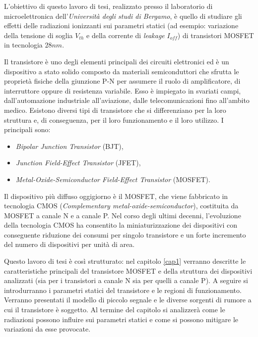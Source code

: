 L'obiettivo di questo lavoro di tesi, realizzato presso il laboratorio di microelettronica dell'\textit{Università degli studi di Bergamo}, è quello di studiare gli effetti delle radiazioni ionizzanti sui parametri statici (ad esempio: variazione della tensione di soglia $V_{th}$ e della corrente di \emph{leakage} $I_{off}$) di transistori MOSFET in tecnologia $28nm$. 

\vspace*{0.5cm}

Il transistore è uno degli elementi principali dei circuiti elettronici ed è un dispositivo a stato solido composto da materiali semiconduttori che sfrutta le proprietà fisiche della giunzione P-N per assumere il ruolo di amplificatore, di interruttore oppure di resistenza variabile.
Esso è impiegato in svariati campi, dall'automazione industriale all'aviazione, dalle telecomunicazioni fino all'ambito medico.
Esistono diversi tipi di transistore che si differenziano per la loro struttura e, di conseguenza, per il loro funzionamento e il loro utilizzo. I principali sono:
\begin{itemize}
    \item \textit{Bipolar Junction Transistor} (BJT),
    \item \textit{Junction Field-Effect Transistor} (JFET),
    \item \textit{Metal-Oxide-Semiconductor Field-Effect Transistor} (MOSFET).
\end{itemize}

Il dispositivo più diffuso oggigiorno è il MOSFET, che viene fabbricato in tecnologia CMOS (\textit{Complementary metal-oxide-semiconductor}), costituita da MOSFET a canale N e a canale P. Nel corso degli ultimi decenni, l'evoluzione della tecnologia CMOS ha consentito la miniaturizzazione dei dispositivi con conseguente riduzione dei consumi per singolo transistore e un forte incremento del numero di dispositivi per unità di area.

\vspace*{0.5cm}

Questo lavoro di tesi è così strutturato: nel capitolo \ref{cap1} verranno descritte le caratteristiche principali del transistore MOSFET e della struttura dei dispositivi analizzati (sia per i transistori a canale N sia per quelli a canale P). A seguire si introdurranno i parametri statici del transistore e le regioni di funzionamento. Verranno presentati il modello di piccolo segnale e le diverse sorgenti di rumore a cui il transistore è soggetto. Al termine del capitolo si analizzerà come le radiazioni possono influire sui parametri statici e come si possono mitigare le variazioni da esse provocate.

